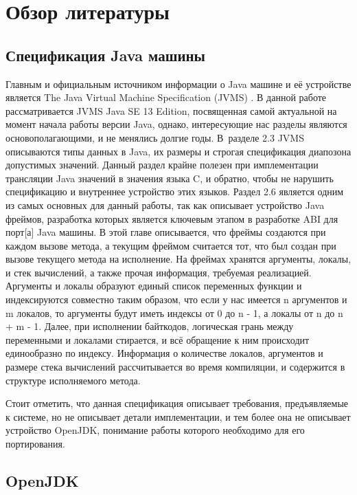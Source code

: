 \section*{Обзор литературы}

\subsection*{Спецификация Java машины}

Главным и официальным источником информации о Java машине и её устройстве является The Java Virtual Machine Specification (JVMS) \cite{jvms}. В данной работе рассматривается JVMS Java SE 13 Edition, посвященная самой актуальной на момент начала работы версии Java, однако, интересующие нас разделы являются основополагающими, и не менялись долгие годы. 
В~разделе 2.3 JVMS описываются типы данных в Java, их размеры и строгая спецификация диапозона допустимых значений. Данный раздел крайне полезен при имплементации трансляции Java значений в значения языка C, и обратно, чтобы не нарушить спецификацию и внутреннее устройство этих языков. Раздел 2.6 является одним из самых основных для данный работы, так как описывает устройство Java фреймов, разработка которых является ключевым этапом в разработке ABI для \gls{порт}[а] Java машины. В этой главе описывается, что фреймы создаются при каждом вызове метода, а текущим фреймом считается тот, что был создан при вызове текущего метода на исполнение. На фреймах хранятся аргументы, локалы, и стек вычислений, а также прочая информация, требуемая реализацией. Аргументы и локалы образуют единый список переменных функции и индексируются совместно таким образом, что если у нас имеется n аргументов и m локалов, то аргументы будут иметь индексы от 0 до n - 1, а локалы от n до n + m - 1. Далее, при исполнении байткодов, логическая грань между переменными и локалами стирается, и всё обращение к ним происходит единообразно по индексу. Информация о количестве локалов, аргументов и размере стека вычислений рассчитывается во время компиляции, и содержится в структуре исполняемого метода.

Стоит отметить, что данная спецификация описывает требования, предъявляемые к системе, но не описывает детали имплементации, и тем более она не описывает устройство OpenJDK, понимание работы которого необходимо для его портирования.


\subsection*{OpenJDK}

